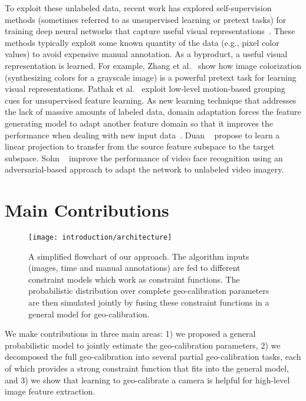 To exploit these unlabeled data, recent work has explored
self-supervision methods (sometimes referred to as unsupervised learning or
pretext tasks) for training deep neural networks that capture useful
visual representations~\cite{doersch2015unsupervised,pathak2016context}. 
These methods typically
exploit some known quantity of the data (e.g., pixel color values) to
avoid expensive manual annotation. As a byproduct, a useful visual
representation is learned.
For example, Zhang et al.~\cite{zhang2016colorful} show how image
colorization (synthesizing colors for a grayscale image) is a powerful
pretext task for learning visual representations. Pathak et
al.~\cite{pathak2017learning} exploit low-level motion-based grouping
cues for unsupervised feature learning.  
%
As new learning technique that addresses the lack of massive amounts
of labeled data, domain adaptation forces the feature generating model
to adapt another feature domain so that it improves the performance
when dealing with new input
data~\cite{fernando2013unsupervised,fernando2015joint,saenko2010adapting,wang2016actions,tinghui2016flow}.
Duan \etal~\cite{duan2012learning} propose to learn a linear
projection to transfer from the source feature subspace to the target
subspace. Sohn \etal~\cite{sohn2017unsupervised} improve the
performance of video face recognition using an adversarial-based
approach to adapt the network to unlabeled video imagery.

\section{Main Contributions}

\begin{figure}
  \centering
  \texttt{[image: introduction/architecture]}
  \caption{A simplified flowchart of our approach. The algorithm
inputs (images, time and manual annotations) are fed to different
constraint models which work as constraint functions. 
The probabilistic distribution over complete geo-calibration
parameters are then simulated jointly by fusing these constraint
functions in a general model for geo-calibration.}
  \label{fig:intro:architecture}
\end{figure}

We make contributions in three main areas: 1) we proposed a general
probabilistic model to jointly estimate the geo-calibration
parameters, 2) we decomposed the full geo-calibration into several
partial geo-calibration tasks, each of which provides a strong
constraint function that fits into the general model, and 3) we show
that learning to geo-calibrate a camera is helpful for high-level
image feature extraction.


